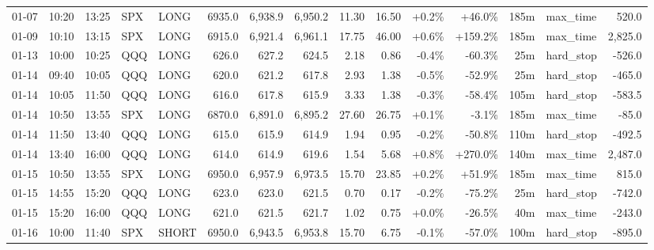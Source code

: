 \documentclass[11pt,a4paper,twoside]{article}
\begin{document}
\begin{landscape}
\begin{center}
\begin{longtable}{>{\color{txtmain}}l l l l l r r r r r r r r >{\color{txtmain}}l r}
01-07 & 10:20 & 13:25 & SPX & LONG & 6935.0 & 6,938.9 & 6,950.2 & 11.30 & 16.50 & \textcolor{wingreen}{+0.2\%} & \textcolor{wingreen}{+46.0\%} & 185m & max\_time & \textcolor{wingreen}{520.0} \\
01-09 & 10:10 & 13:15 & SPX & LONG & 6915.0 & 6,921.4 & 6,961.1 & 17.75 & 46.00 & \textcolor{wingreen}{+0.6\%} & \textcolor{wingreen}{+159.2\%} & 185m & max\_time & \textcolor{wingreen}{2,825.0} \\
01-13 & 10:00 & 10:25 & QQQ & LONG & 626.0 & 627.2 & 624.5 & 2.18 & 0.86 & \textcolor{lossred}{-0.4\%} & \textcolor{lossred}{-60.3\%} & 25m & hard\_stop & \textcolor{lossred}{-526.0} \\
01-14 & 09:40 & 10:05 & QQQ & LONG & 620.0 & 621.2 & 617.8 & 2.93 & 1.38 & \textcolor{lossred}{-0.5\%} & \textcolor{lossred}{-52.9\%} & 25m & hard\_stop & \textcolor{lossred}{-465.0} \\
01-14 & 10:05 & 11:50 & QQQ & LONG & 616.0 & 617.8 & 615.9 & 3.33 & 1.38 & \textcolor{lossred}{-0.3\%} & \textcolor{lossred}{-58.4\%} & 105m & hard\_stop & \textcolor{lossred}{-583.5} \\
01-14 & 10:50 & 13:55 & SPX & LONG & 6870.0 & 6,891.0 & 6,895.2 & 27.60 & 26.75 & \textcolor{wingreen}{+0.1\%} & \textcolor{lossred}{-3.1\%} & 185m & max\_time & \textcolor{lossred}{-85.0} \\
01-14 & 11:50 & 13:40 & QQQ & LONG & 615.0 & 615.9 & 614.9 & 1.94 & 0.95 & \textcolor{lossred}{-0.2\%} & \textcolor{lossred}{-50.8\%} & 110m & hard\_stop & \textcolor{lossred}{-492.5} \\
01-14 & 13:40 & 16:00 & QQQ & LONG & 614.0 & 614.9 & 619.6 & 1.54 & 5.68 & \textcolor{wingreen}{+0.8\%} & \textcolor{wingreen}{+270.0\%} & 140m & max\_time & \textcolor{wingreen}{2,487.0} \\
01-15 & 10:50 & 13:55 & SPX & LONG & 6950.0 & 6,957.9 & 6,973.5 & 15.70 & 23.85 & \textcolor{wingreen}{+0.2\%} & \textcolor{wingreen}{+51.9\%} & 185m & max\_time & \textcolor{wingreen}{815.0} \\
01-15 & 14:55 & 15:20 & QQQ & LONG & 623.0 & 623.0 & 621.5 & 0.70 & 0.17 & \textcolor{lossred}{-0.2\%} & \textcolor{lossred}{-75.2\%} & 25m & hard\_stop & \textcolor{lossred}{-742.0} \\
01-15 & 15:20 & 16:00 & QQQ & LONG & 621.0 & 621.5 & 621.7 & 1.02 & 0.75 & \textcolor{wingreen}{+0.0\%} & \textcolor{lossred}{-26.5\%} & 40m & max\_time & \textcolor{lossred}{-243.0} \\
01-16 & 10:00 & 11:40 & SPX & SHORT & 6950.0 & 6,943.5 & 6,953.8 & 15.70 & 6.75 & \textcolor{lossred}{-0.1\%} & \textcolor{lossred}{-57.0\%} & 100m & hard\_stop & \textcolor{lossred}{-895.0} \\

\end{longtable}
\end{center}
\end{landscape}
\end{document}
